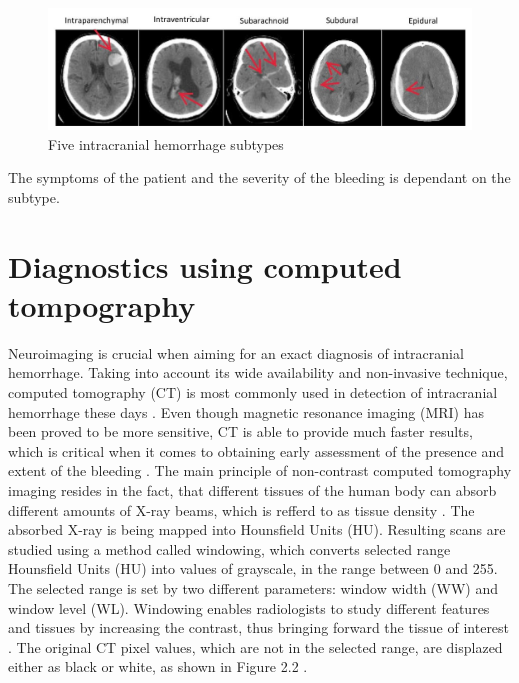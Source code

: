 \begin{figure}[h]
\begin{centering}
\includegraphics[width=14cm]{assets/images/subtypes}
\par\end{centering}
\caption{Five intracranial hemorrhage subtypes \label{fig:subtypes}}
\end{figure}

The symptoms of the patient and the severity of the bleeding is dependant on the subtype. 

\section{Diagnostics using computed tompography}
Neuroimaging is crucial when aiming for an exact diagnosis of intracranial hemorrhage.  Taking into account its wide availability and non-invasive technique, computed tomography (CT) is most commonly used in detection of intracranial hemorrhage these days \cite{imagingICH}. Even though magnetic resonance imaging (MRI) has been proved to be more sensitive, CT is able to provide much faster results, which is critical when it comes to obtaining early assessment of the presence and extent of the bleeding \cite{imagingAfterBrainInjury}. The main principle of non-contrast computed tomography imaging resides in the fact, that different tissues of the human body can absorb different amounts of X-ray beams, which is refferd to as tissue density \cite{principlesOfCT}. The absorbed X-ray is being mapped into Hounsfield Units (HU). Resulting scans are studied using a method called windowing, which converts selected range Hounsfield Units (HU) into values of grayscale, in the range between 0 and 255. The selected range is set by two different parameters: window width (WW) and window level (WL). Windowing enables radiologists to study different features and tissues by increasing the contrast, thus bringing forward the tissue of interest \cite{windowClassBiomArt}. The original CT pixel values, which are not in the selected range, are displazed either as black or white, as shown in Figure 2.2 .

